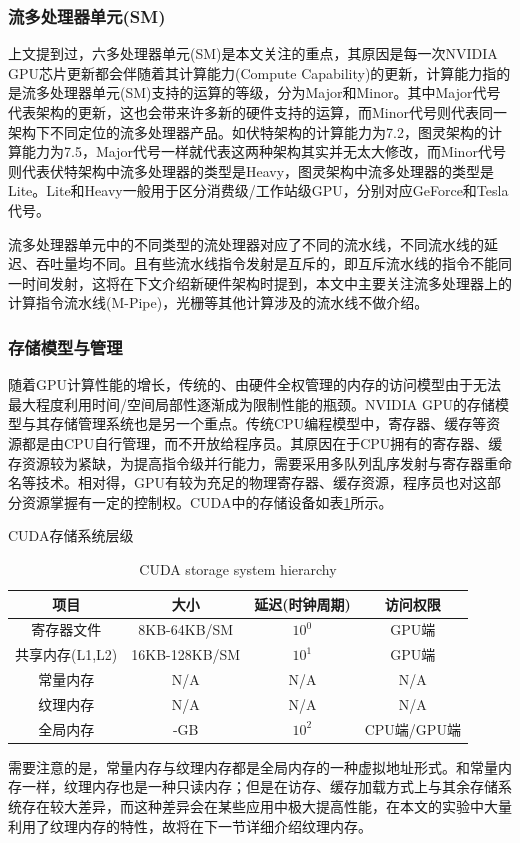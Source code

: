 \subsubsection{流多处理器单元(SM)} 
\par 上文提到过，六多处理器单元(SM)是本文关注的重点，其原因是每一次NVIDIA GPU芯片更新都会伴随着其计算能力(Compute Capability)的更新，计算能力指的是流多处理器单元(SM)支持的运算的等级，分为Major和Minor。其中Major代号代表架构的更新，这也会带来许多新的硬件支持的运算，而Minor代号则代表同一架构下不同定位的流多处理器产品。如伏特架构的计算能力为7.2，图灵架构的计算能力为7.5，Major代号一样就代表这两种架构其实并无太大修改，而Minor代号则代表伏特架构中流多处理器的类型是Heavy，图灵架构中流多处理器的类型是Lite。Lite和Heavy一般用于区分消费级/工作站级GPU，分别对应GeForce和Tesla代号。
\par 流多处理器单元中的不同类型的流处理器对应了不同的流水线，不同流水线的延迟、吞吐量均不同。且有些流水线指令发射是互斥的，即互斥流水线的指令不能同一时间发射，这将在下文介绍新硬件架构时提到，本文中主要关注流多处理器上的计算指令流水线(M-Pipe)，光栅等其他计算涉及的流水线不做介绍。
\subsubsection{存储模型与管理} 
\par 随着GPU计算性能的增长，传统的、由硬件全权管理的内存的访问模型由于无法最大程度利用时间/空间局部性逐渐成为限制性能的瓶颈\parencite{HIER}。NVIDIA GPU的存储模型与其存储管理系统也是另一个重点。传统CPU编程模型中，寄存器、缓存等资源都是由CPU自行管理，而不开放给程序员。其原因在于CPU拥有的寄存器、缓存资源较为紧缺，为提高指令级并行能力，需要采用多队列乱序发射与寄存器重命名等技术。相对得，GPU有较为充足的物理寄存器、缓存资源，程序员也对这部分资源掌握有一定的控制权\parencite{CUDAPROG}。CUDA中的存储设备如表\ref{table-存储}所示。
\begin{table}
	\centering
	\renewcommand{\thetable}{\arabic{section}-\arabic{table} }
	\renewcommand{\tablename}{表}
	\caption{CUDA存储系统层级}
	\addtocounter{table}{-1}
	\renewcommand{\thetable}{\arabic{section}-\arabic{table} }
	\renewcommand{\tablename}{Table}
	\caption{CUDA storage system hierarchy}
	\begin{tabular}{cccc}
		\toprule
		项目				&	大小			&	延迟(时钟周期)	&	访问权限	\\
		\midrule
		寄存器文件		&	8KB-64KB/SM		&	$ 10^0 $	& GPU端	\\
		共享内存(L1,L2)	&	16KB-128KB/SM	&	$ 10^1 $	&	GPU端\\
		常量内存		&	N/A				&	N/A		&	N/A	\\
		纹理内存		&	N/A				&	N/A		&	N/A \\
		全局内存		&	-GB				&	$ 10^2 $	&	CPU端/GPU端 \\
		\bottomrule
	\end{tabular} \label{table-存储}
\end{table}
\par 需要注意的是，常量内存与纹理内存都是全局内存的一种虚拟地址形式。和常量内存一样，纹理内存也是一种只读内存；但是在访存、缓存加载方式上与其余存储系统存在较大差异，而这种差异会在某些应用中极大提高性能，在本文的实验中大量利用了纹理内存的特性，故将在下一节详细介绍纹理内存。
